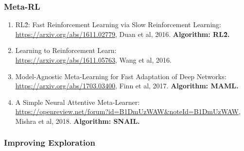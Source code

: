 \documentclass[lang=cn,11pt,a4paper]{eleganttemplate}
\begin{document}
\subsubsection{Meta-RL}
\begin{enumerate}
    \item RL\^2: Fast Reinforcement Learning via Slow Reinforcement Learning:\\ \href{https://arxiv.org/abs/1611.02779}{https://arxiv.org/abs/1611.02779}, Duan et al, 2016. \textbf{Algorithm: RL\^2.}
    \item Learning to Reinforcement Learn:\\ \href{https://arxiv.org/abs/1611.05763}{https://arxiv.org/abs/1611.05763}, Wang et al, 2016.
    \item Model-Agnostic Meta-Learning for Fast Adaptation of Deep Networks:\\ \href{https://arxiv.org/abs/1703.03400}{https://arxiv.org/abs/1703.03400}, Finn et al, 2017. \textbf{Algorithm: MAML.}
    \item A Simple Neural Attentive Meta-Learner:\\ \href{https://openreview.net/forum?id=B1DmUzWAW&noteId=B1DmUzWAW}{https://openreview.net/forum?id=B1DmUzWAW\&noteId=B1DmUzWAW}, Mishra et al, 2018. \textbf{Algorithm: SNAIL.}
\end{enumerate}

\subsubsection{Improving Exploration}
\end{document}
